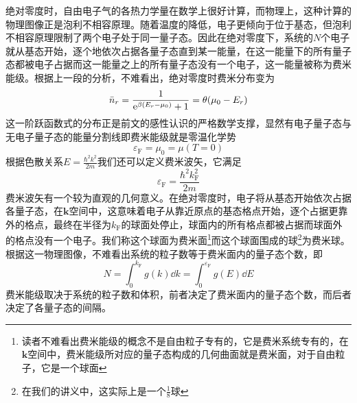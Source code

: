 \documentclass[../../main.tex]{subfiles}
\begin{document}
绝对零度时，自由电子气的各热力学量在数学上很好计算，而物理上，这种计算的物理图像正是泡利不相容原理。随着温度的降低，电子更倾向于位于基态，但泡利不相容原理限制了两个电子处于同一量子态。因此在绝对零度下，系统的\(N\)个电子就从基态开始，逐个地依次占据各量子态直到某一能量，在这一能量下的所有量子态都被电子占据而这一能量之上的所有量子态没有一个电子，这一能量被称为费米能级。根据上一段的分析，不难看出，绝对零度时费米分布变为
\begin{equation}
    \bar{n}_{r}=\frac{1}{\mathrm{e}^{\beta(E_r-\mu_0)}+1}=\theta(\mu_0-E_r)
\end{equation}
这一阶跃函数式的分布正是前文的感性认识的严格数学支撑，显然有电子量子态与无电子量子态的能量分割线即费米能级就是零温化学势
\begin{equation}
    \varepsilon_{\mathrm{F}}=\mu_0=\mu(T=0)
\end{equation}
根据色散关系\(E=\frac{\hbar^2k^2}{2m}\)我们还可以定义费米波矢，它满足
\begin{equation}
    \varepsilon_{\mathrm{F}}=\frac{\hbar^2k_{\mathrm{F}}^2}{2m}
\end{equation}
费米波矢有一个较为直观的几何意义。在绝对零度时，电子将从基态开始依次占据各量子态，在\(\bm{k}\)空间中，这意味着电子从靠近原点的基态格点开始，逐个占据更靠外的格点，最终在半径为\(k_{\mathrm{F}}\)的球面处停止，球面内的所有格点都被占据而球面外的格点没有一个电子。我们称这个球面为费米面\footnote{读者不难看出费米能级的概念不是自由粒子专有的，它是费米系统专有的，在\(\bm{k}\)空间中，费米能级所对应的量子态构成的几何曲面就是费米面，对于自由粒子，它是一个球面}而这个球面围成的球\footnote{在我们的讲义中，这实际上是一个\(\frac{1}{8}\)球}为费米球。根据这一物理图像，不难看出系统的粒子数等于费米面内的量子态个数，即
\begin{equation}
    N=\int_0^{k_{\mathrm{F}}}g(k)\dd k=\int_0^{\varepsilon_{\mathrm{F}}}g(E)\dd E
\end{equation}
费米能级取决于系统的粒子数和体积，前者决定了费米面内的量子态个数，而后者决定了各量子态的间隔。
\end{document}
